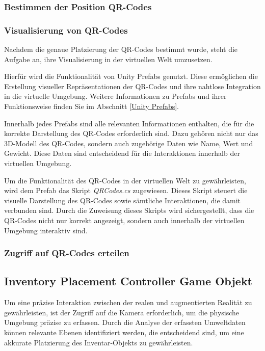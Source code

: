 \subsubsection{Bestimmen der Position QR-Codes}

\subsubsection{Visualisierung von QR-Codes}
Nachdem die genaue Platzierung der QR-Codes bestimmt wurde, steht die Aufgabe an, ihre Visualisierung in der virtuellen Welt umzusetzen.

Hierfür wird die Funktionalität von Unity Prefabs genutzt. Diese ermöglichen die Erstellung visueller Repräsentationen
der QR-Codes und ihre nahtlose Integration in die virtuelle Umgebung. Weitere Informationen zu Prefabs und ihrer Funktionsweise
finden Sie im Abschnitt \ref{Unity Prefabs}.

Innerhalb jedes Prefabs sind alle relevanten Informationen enthalten, die für die korrekte Darstellung des QR-Codes
erforderlich sind. Dazu gehören nicht nur das 3D-Modell des QR-Codes, sondern auch zugehörige Daten wie Name, Wert und
Gewicht. Diese Daten sind entscheidend für die Interaktionen innerhalb der virtuellen Umgebung.

Um die Funktionalität des QR-Codes in der virtuellen Welt zu gewährleisten, wird dem Prefab das Skript \textit{QRCodes.cs} zugewiesen.
Dieses Skript steuert die visuelle Darstellung des QR-Codes sowie sämtliche Interaktionen, die damit verbunden sind. Durch
die Zuweisung dieses Skripts wird sichergestellt, dass die QR-Codes nicht nur korrekt angezeigt, sondern auch innerhalb
der virtuellen Umgebung interaktiv sind.

\subsubsection{Zugriff auf QR-Codes erteilen}

\subsection{Inventory Placement Controller Game Objekt}
Um eine präzise Interaktion zwischen der realen und augmentierten Realität zu gewährleisten, ist der Zugriff auf die Kamera
erforderlich, um die physische Umgebung präzise zu erfassen. Durch die Analyse der erfassten Umweltdaten können relevante
Ebenen identifiziert werden, die entscheidend sind, um eine akkurate Platzierung des Inventar-Objekts zu gewährleisten.

